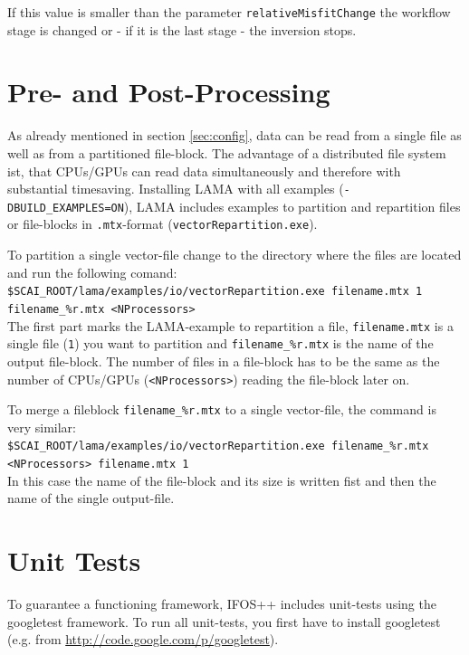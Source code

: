 \documentclass[pdftex,a4paper,parskip,listof=totoc,bibliography=totoc,onehalfspacing,12pt]{scrreprt}
\newcommand{\shellcmd}[1]{\indent\indent\texttt{#1}}	%
\newcommand{\shellcmdline}[1]{\indent\indent\texttt{\quad#1}} 	%
\begin{document}
If this value is smaller than the parameter \verb+relativeMisfitChange+ the workflow stage is changed or - if it is the last stage - the inversion stops.


\clearpage
\section{Pre- and Post-Processing}\label{sec:process}

As already mentioned in section \ref{sec:config}, data can be read from a single file as well as from a partitioned file-block. The advantage of a distributed file system ist, that CPUs/GPUs can read data simultaneously and therefore with substantial timesaving. Installing LAMA with all examples (\shellcmd{-DBUILD\_EXAMPLES=ON}), LAMA includes examples to partition and repartition files or file-blocks in \shellcmd{.mtx}-format (\shellcmd{vectorRepartition.exe}). 

To partition a single vector-file change to the directory where the files are located and run the following comand:  \\
\shellcmdline{\$SCAI\_ROOT/lama/examples/io/vectorRepartition.exe filename.mtx 1 }\\
\shellcmdline{filename\_\%r.mtx <NProcessors>}\\
The first part marks the LAMA-example to repartition a file, \shellcmd{filename.mtx} is a single file (\shellcmd{1}) you want to partition and \shellcmd{filename\_\%r.mtx} is the name of the output file-block. The number of files in a file-block has to be the same as the number of CPUs/GPUs (\shellcmd{<NProcessors>}) reading the file-block later on. 

To merge a fileblock \shellcmd{filename\_\%r.mtx} to a single vector-file, the command is very similar:\\
\shellcmdline{\$SCAI\_ROOT/lama/examples/io/vectorRepartition.exe filename\_\%r.mtx}\\
\shellcmdline{<NProcessors> filename.mtx 1}\\
In this case the name of the file-block and its size is written fist and then the name of the single output-file.

\section{Unit Tests}
To guarantee a functioning framework, IFOS++ includes unit-tests using the googletest framework. To run all unit-tests, you first have to install googletest (e.g. from \url{http://code.google.com/p/googletest}). 
\end{document}
